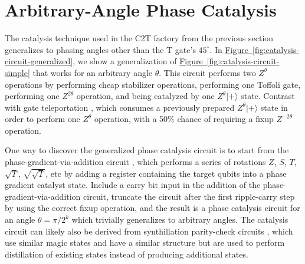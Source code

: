 \documentclass[twocolumn,accepted=2019-03-30]{quantumarticle}
\newcommand{\fig}[1]{\hyperref[fig:#1]{Figure~\ref*{fig:#1}}}
\begin{document}
\section{Arbitrary-Angle Phase Catalysis}
\label{sec:generalize}

The catalysis technique used in the C2T factory from the previous section generalizes to phasing angles other than the T gate's $45^\circ$.
In \fig{catalysis-circuit-generalized}, we show a generalization of \fig{catalysis-circuit-simple} that works for an arbitrary angle $\theta$.
This circuit performs two $Z^\theta$ operations by performing cheap stabilizer operations, performing one Toffoli gate, performing one $Z^{2 \theta}$ operation, and being catalyzed by one $Z^\theta |+\rangle$ state.
Contrast with gate teleportation \cite{gottesman1999}, which consumes a previously prepared $Z^\theta |+\rangle$ state in order to perform one $Z^\theta$ operation, with a 50\% chance of requiring a fixup $Z^{-2 \theta}$ operation.

One way to discover the generalized phase catalysis circuit is to start from the phase-gradient-via-addition circuit \cite{kitaev2002, gidney2018, nam2018}, which performs a series of rotations $Z$, $S$, $T$, $\sqrt{T}$, $\sqrt{\sqrt{T}}$, etc by adding a register containing the target qubits into a phase gradient catalyst state.
Include a carry bit input in the addition of the phase-gradient-via-addition circuit, truncate the circuit after the first ripple-carry step by using the correct fixup operation, and the result is a phase catalysis circuit for an angle $\theta=\pi/2^k$ which trivially generalizes to arbitrary angles.
The catalysis circuit can likely also be derived from synthillation parity-check circuits \cite{campbell2018}, which use similar magic states and have a similar structure but are used to perform distillation of existing states instead of producing additional states.
\end{document}
